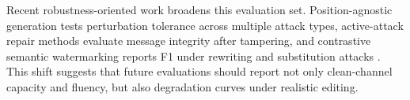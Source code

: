 Recent robustness-oriented work broadens this evaluation set. Position-agnostic generation tests perturbation tolerance across multiple attack types, active-attack repair methods evaluate message integrity after tampering, and contrastive semantic watermarking reports F1 under rewriting and substitution attacks \cite{lin2025positionagnostic,chen2025activetwo,wang2025contrastive}. This shift suggests that future evaluations should report not only clean-channel capacity and fluency, but also degradation curves under realistic editing.



